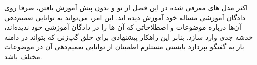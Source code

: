 اکثر مدل های معرفی شده در این فصل از نو و بدون پیش آموزش یافتن، صرفا روی دادگان آموزشی مساله خود آموزش دیده اند. این امر، می‌تواند به توانایی تعمیم‌دهی آن‌ها درباره موضوعات و اصطلاحاتی که آن ها را در دادگان آموزشی خود ندیده‌اند، خدشه جدی وارد سازد. بنابر این راهکار پیشنهادی برای خلق گپ‌زنی که بتواند در دامنه باز به گفتگو بپردازد بایستی مستلزم اطمینان از توانایی تعمیم‌دهی آن در موضوعات مختلف باشد. 

